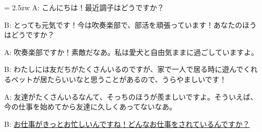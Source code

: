 \documentclass[11pt]{amsart}
\title{}
\author{}
\newenvironment{hangall}[1]{\hangindent = 2.5zw\everypar{\hangindent = 2.5zw}}{}
\begin{document}
\maketitle
\begin{hangall}{}%
A: こんにちは！最近調子はどうですか？

B: とっても元気です！今は吹奏楽部で、部活を頑張っています！あなたのほうはどうですか？

A: 吹奏楽部ですか！素敵だなあ。私は愛犬と自由気ままに過ごしていますよ。

B: わたしには友だちがたくさんいるのですが、家で一人で居る時に遊んでくれるペットが居たらいいなと思うことがあるので、うらやましいです！

A: 友達がたくさんいるなんて、そっちのほうが羨ましいですよ。そういえば、今の仕事を始めてから友達に久しくあってないなあ。

B: \ul{お仕事がきっとお忙しいんですね！どんなお仕事をされているんですか？}\end{hangall}
\end{document}
